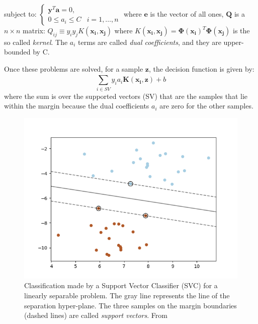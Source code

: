 \documentclass{standalone}
\begin{document}
subject to: $\begin{cases}
    \mathbf{y}^T \mathbf{a} = 0, &  \\
    0 \leq a_i \leq C  &  i = 1, \dots, n
    \end{cases}$
\newline
where $\mathbf{e}$ is the vector of all ones, $\mathbf{Q}$ is a $n \times n$ matrix: $Q_{ij}\equiv y_i y_j K(\mathbf{x_i}, \mathbf{x_j})$ where $K(\mathbf{x_i}, \mathbf{x_j}) = \mathbf{\Phi(x_i)}^T \mathbf{\Phi(x_j)} $ is the so called \textit{kernel}.
The $a_i$ terms are called \textit{dual coefficients}, and they are upper-bounded by C.\\


\newpage
{}
Once these problems are solved, for a sample $\mathbf{z}$, the decision function is given by: 
\begin{equation}
    \sum_{i \in SV}^{}  y_i a_i \mathbf{K(x_i, z)} + b
\end{equation}
where the sum is over the supported  vectors (SV) that are the samples that lie within the margin because the dual coefficients $a_i$ are zero for the other samples\cite{SVCscikit}.

\begin{figure}[ht]

    \centering
    \includegraphics[width=.95\textwidth]{../images/svcexample.png}
    
    \caption{Classification made by a Support Vector Classifier (SVC) for a linearly separable problem. The gray line represents the line of the separation hyper-plane. The three samples on the margin boundaries (dashed lines) are called \textit{support vectors}. From \cite{SVCscikit}}\label{fig:svc}
    
    
    \end{figure}
\end{document}

